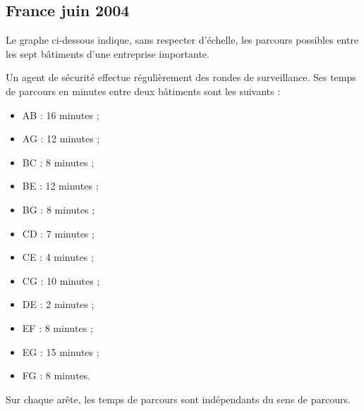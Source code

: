 \vfill\newpage
\subsection{France  juin 2004}

Le graphe ci-dessous indique, sans respecter d'échelle, les parcours possibles entre les sept bâtiments d'une entreprise importante.

\medskip
{}

Un agent de sécurité effectue régulièrement des rondes de surveillance. Ses temps de parcours en minutes entre deux bâtiments sont les
suivants :

\medskip
\begin{center}
\begin{minipage}{0.5\textwidth}
    \begin{itemize}
    \item AB : 16 minutes ;
    \item AG : 12 minutes ;
    \item BC : 8 minutes ;
    \item BE : 12 minutes ;
    \item BG : 8 minutes ;
    \item CD : 7 minutes ;
    \item CE : 4 minutes ;
    \item CG : 10 minutes ;
    \item DE : 2 minutes ;
    \item EF : 8 minutes ;
    \item EG : 15 minutes ;
    \item FG : 8 minutes.
    \end{itemize}
\end{minipage}
\end{center}

\medskip
Sur chaque arête, les temps de parcours sont indépendants du sens de parcours.

